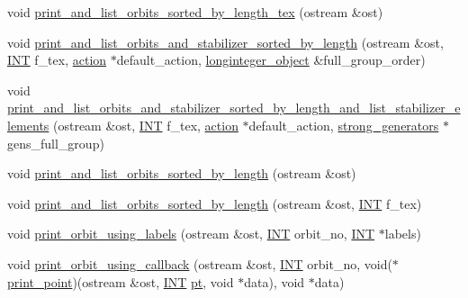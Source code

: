 \begin{DoxyCompactItemize}
void \mbox{\hyperlink{classschreier_a8ea6634afbd63695d64bb0a4237f28d5}{print\+\_\+and\+\_\+list\+\_\+orbits\+\_\+sorted\+\_\+by\+\_\+length\+\_\+tex}} (ostream \&ost)
\item 
void \mbox{\hyperlink{classschreier_ab8afe2cb22f49ac1baae07143a6bb3fb}{print\+\_\+and\+\_\+list\+\_\+orbits\+\_\+and\+\_\+stabilizer\+\_\+sorted\+\_\+by\+\_\+length}} (ostream \&ost, \mbox{\hyperlink{galois_8h_a09fddde158a3a20bd2dcadb609de11dc}{I\+NT}} f\+\_\+tex, \mbox{\hyperlink{classaction}{action}} $\ast$default\+\_\+action, \mbox{\hyperlink{classlonginteger__object}{longinteger\+\_\+object}} \&full\+\_\+group\+\_\+order)
\item 
void \mbox{\hyperlink{classschreier_a345d0b1a6837fd248e1785e45323c1fa}{print\+\_\+and\+\_\+list\+\_\+orbits\+\_\+and\+\_\+stabilizer\+\_\+sorted\+\_\+by\+\_\+length\+\_\+and\+\_\+list\+\_\+stabilizer\+\_\+elements}} (ostream \&ost, \mbox{\hyperlink{galois_8h_a09fddde158a3a20bd2dcadb609de11dc}{I\+NT}} f\+\_\+tex, \mbox{\hyperlink{classaction}{action}} $\ast$default\+\_\+action, \mbox{\hyperlink{classstrong__generators}{strong\+\_\+generators}} $\ast$gens\+\_\+full\+\_\+group)
\item 
void \mbox{\hyperlink{classschreier_a28b773e6bc98fe2171eb77f2c73bcc4e}{print\+\_\+and\+\_\+list\+\_\+orbits\+\_\+sorted\+\_\+by\+\_\+length}} (ostream \&ost)
\item 
void \mbox{\hyperlink{classschreier_a4c4ebf752711c6058e313fa3cfeb55df}{print\+\_\+and\+\_\+list\+\_\+orbits\+\_\+sorted\+\_\+by\+\_\+length}} (ostream \&ost, \mbox{\hyperlink{galois_8h_a09fddde158a3a20bd2dcadb609de11dc}{I\+NT}} f\+\_\+tex)
\item 
void \mbox{\hyperlink{classschreier_a6d9debe3b65c697b510549aa198b7bc6}{print\+\_\+orbit\+\_\+using\+\_\+labels}} (ostream \&ost, \mbox{\hyperlink{galois_8h_a09fddde158a3a20bd2dcadb609de11dc}{I\+NT}} orbit\+\_\+no, \mbox{\hyperlink{galois_8h_a09fddde158a3a20bd2dcadb609de11dc}{I\+NT}} $\ast$labels)
\item 
void \mbox{\hyperlink{classschreier_a573cd3887d210fb71d71b2cec9cd8713}{print\+\_\+orbit\+\_\+using\+\_\+callback}} (ostream \&ost, \mbox{\hyperlink{galois_8h_a09fddde158a3a20bd2dcadb609de11dc}{I\+NT}} orbit\+\_\+no, void($\ast$\mbox{\hyperlink{top__level_8h_a2bde441010b814b154aea558c1272280}{print\+\_\+point}})(ostream \&ost, \mbox{\hyperlink{galois_8h_a09fddde158a3a20bd2dcadb609de11dc}{I\+NT}} \mbox{\hyperlink{clique__finder_8_c_aec1f1a2b30fdca8844c2932384483145}{pt}}, void $\ast$data), void $\ast$data)
\item 

\end{DoxyCompactItemize}
